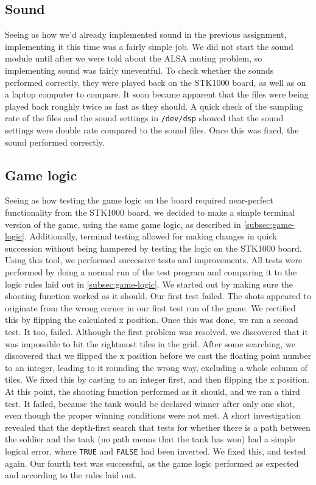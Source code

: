 \subsection{Sound}
Seeing as how we'd already implemented sound in the previous assignment, implementing it this time was a fairly simple job. We did not start the sound module until after we were told about the ALSA muting problem, so implementing sound was fairly uneventful. To check whether the sounds performed correctly, they were played back on the STK1000 board, as well as on a laptop computer to compare. It soon became apparent that the files were being played back roughly twice as fast as they should. A quick check of the sampling rate of the files and the sound settings in \texttt{/dev/dsp} showed that the sound settings were double rate compared to the sound files. Once this was fixed, the sound performed correctly.

\subsection{Game logic}
Seeing as how testing the game logic on the board required near-perfect
functionality from the STK1000 board, we decided to make a simple
terminal version of the game, using the same game logic, as described in
\ref{subsec:game-logic}. Additionally, terminal testing allowed for making 
changes in quick succession without being hampered by testing the logic on the STK1000 board.
Using this tool, we performed successive tests and improvements. All tests were performed by doing a normal run of the test program and comparing it to the logic rules laid out in \ref{subsec:game-logic}. We started out by making sure the shooting function worked as it should.
Our first test failed. The shots appeared to originate from the wrong corner in our first test run of the game. We rectified this by flipping the calculated x position. 
Once this was done, we ran a second test. It too, failed. Although the first problem was resolved, we discovered that it was impossible to hit the rightmost tiles in the grid. After some searching, we discovered that we flipped the x position before we cast the floating point number to an integer, leading to it rounding the wrong way, excluding a whole column of tiles. We fixed this by casting to an integer first, and then flipping the x position.
At this point, the shooting function performed as it should, and we ran a third test. It failed, because the tank would be declared winner after only one shot, even though the proper winning conditions were not met. A short investigation revealed that the depth-first search that tests for whether there is a path between the soldier and the tank (no path means that the tank has won) had a simple logical error, where \texttt{TRUE} and \texttt{FALSE} had been inverted. We fixed this, and tested again.
Our fourth test was successful, as the game logic performed as expected and according to the rules laid out.

